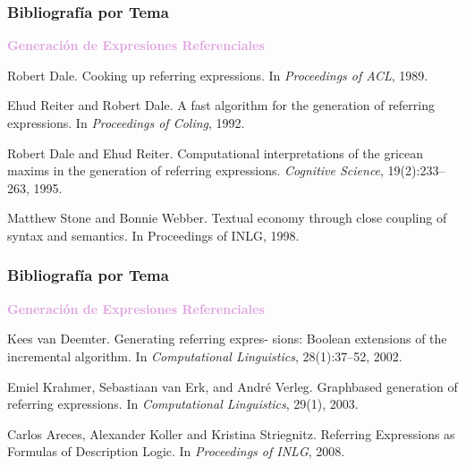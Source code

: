 \documentclass[compress,color=usenames]{beamer}
\newcommand{\mH}[1]{\textcolor{Plum}{#1}}
\begin{document}
\begin{frame}
\frametitle{Bibliograf\'ia por Tema}
\mH{\bf Generaci\'on de Expresiones Referenciales}
\medskip

\begin{thebibliography}{10}\small

 Robert Dale.
\newblock Cooking up referring expressions.
\newblock In \emph{Proceedings of ACL}, 1989.

 Ehud Reiter and Robert Dale.
\newblock A fast algorithm for the generation of referring expressions.
\newblock In \emph{Proceedings of Coling}, 1992.

 Robert Dale and Ehud Reiter.
\newblock Computational interpretations of the gricean maxims in the generation of referring expressions.
\newblock \emph{Cognitive Science}, 19(2):233--263, 1995.

 Matthew Stone and Bonnie Webber.  
\newblock Textual economy through close coupling of syntax and semantics. 
\newblock In {Proceedings of INLG},  1998.

\end{thebibliography}
\end{frame}

\begin{frame}
\frametitle{Bibliograf\'ia por Tema}

\mH{\bf Generaci\'on de Expresiones Referenciales}
\medskip

\begin{thebibliography}{10}\small

 Kees van Deemter.
\newblock Generating referring expres-
sions: Boolean extensions of the incremental algorithm.
\newblock In \emph{Computational Linguistics}, 28(1):37--52, 2002.

 Emiel Krahmer, Sebastiaan van Erk, and Andr\'e Verleg.
\newblock Graphbased generation of referring expressions.
\newblock In \emph{Computational Linguistics}, 29(1), 2003.

 Carlos Areces, Alexander Koller and Kristina Striegnitz. 
\newblock Referring Expressions as Formulas of Description Logic. 
\newblock In \emph{Proceedings of INLG}, 2008.

\end{thebibliography}
\end{frame}
\end{document}
